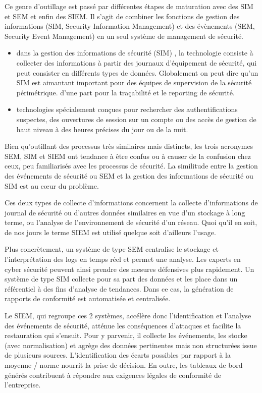  Ce genre d'outillage est passé par différentes étapes de maturation avec des SIM et SEM  et enfin des SIEM.
Il s’agit de combiner les fonctions de gestion des informations (SIM, Security Information Management) et des évènements  (SEM, Security Event Management) en un seul système de management de sécurité.

\begin{itemize}

	\item dans la gestion des informations de sécurité (SIM) , la technologie consiste  à collecter des informations à partir des journaux d'équipement de sécurité, qui peut consister en différents types de données. Globalement on peut dire qu'un SIM est aimantant important pour des équipes de supervision de la sécurité périmétrique. d'une part pour la traçabilité et le reporting de sécurité.
	\item technologies spécialement conçues pour rechercher des authentifications suspectes, des ouvertures de session sur un compte ou des accès de gestion de haut niveau à des heures précises du jour ou de la nuit.
\end{itemize}

Bien qu'outillant des processus très similaires mais distincts, les trois acronymes SEM, SIM et SIEM ont tendance à être confus ou à causer de la confusion chez ceux, peu familiarisés avec les processus de sécurité.
La similitude entre la gestion des événements de sécurité ou SEM et la gestion des informations de sécurité ou SIM est au cœur du problème.

Ces deux types de collecte d'informations concernent la collecte d'informations de journal de sécurité ou d'autres données similaires en vue d'un stockage à long terme, ou l'analyse de l'environnement de sécurité d'un réseau. Quoi qu'il en soit, de nos jours le terme SIEM est utilisé quelque soit d'ailleurs l'usage.


Plus concrètement, un système de type SEM centralise le stockage et l’interprétation des logs en temps réel et permet une analyse. Les experts en cyber sécurité peuvent ainsi prendre des mesures défensives plus rapidement. Un système de type SIM collecte pour sa part des données et les place dans un référentiel à des fins d’analyse de tendances. Dans ce cas, la génération de rapports de conformité est automatisée et centralisée.

Le SIEM, qui regroupe ces 2 systèmes, accélère donc l’identification et l’analyse des événements de sécurité, atténue les conséquences d’attaques et facilite la restauration qui s’ensuit. Pour y parvenir, il collecte les événements, les stocke (avec normalisation) et agrège des données pertinentes mais non structurées issue de plusieurs sources. L’identification des écarts possibles par rapport à la moyenne / norme nourrit la prise de décision. En outre, les tableaux de bord générés contribuent à répondre aux exigences légales de conformité de l’entreprise.

